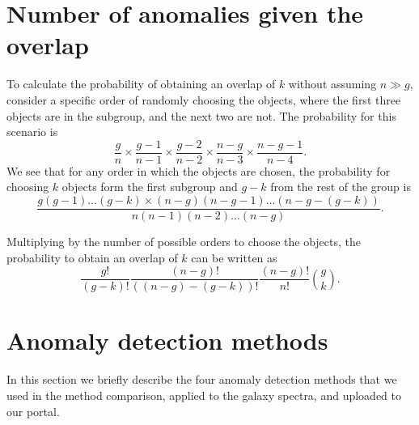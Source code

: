 \documentclass[fleqn,usenatbib]{mnras}
\begin{document}
{%



%








\appendix

\section{Number of anomalies given the overlap}
\label{app:fullcalc}
To calculate the probability of obtaining an overlap of $k$ without assuming $n \gg g$, consider a specific order of randomly choosing the objects, where the first three objects are in  the subgroup, and the next two are not. The probability for this scenario is 
\begin{equation}
    \frac{g}{n} \times \frac{g-1}{n-1} \times \frac{g-2}{n-2} \times \frac{n-g}{n-3} \times \frac{n-g-1}{n-4}.
\end{equation}
We see that for any order in which the objects are chosen, the probability for choosing $k$ objects form the first subgroup and $g-k$ from the rest of the group is 
\begin{equation}
    \frac{g(g-1)\dots(g-k)\times(n-g)(n-g-1)\dots(n-g - (g-k))}{n (n-1)  (n-2) \dots  (n-g)} .
\end{equation}

Multiplying by the number of possible orders to choose the objects, the probability to obtain an overlap of $k$ can be written as 
\begin{equation}
    \frac{g!}{(g-k)!} \frac{(n-g)!}{((n-g) - (g-k) )!} \frac{(n-g)!}{n!}
    {g\choose k}.
\end{equation}



\section{Anomaly detection methods}
\label{app:methods}
In this section we briefly describe the four anomaly detection methods that we used in the method comparison, applied to the galaxy spectra, and uploaded to our portal. 

}
\end{document}

